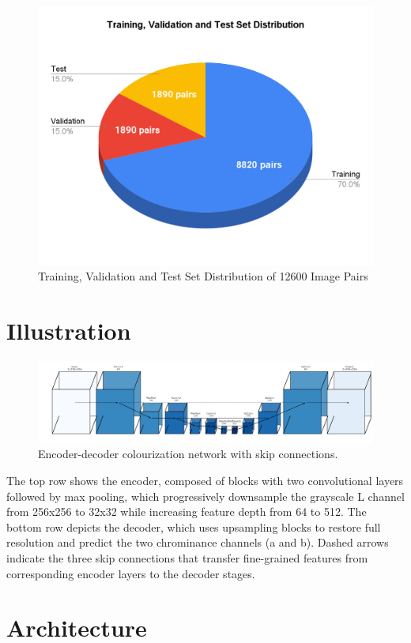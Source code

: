 \documentclass{article} %
\begin{document}
\begin{figure}[htbp]            %
  \centering
  \includegraphics[width=0.65\linewidth]{Figs/dataset1.png}
  \caption{Training, Validation and Test Set Distribution of 12600 Image Pairs}
  \label{fig:dataset}
\end{figure}

\section{Illustration}

\begin{figure}[htbp]            %
  \centering
  \includegraphics[width=0.9\linewidth]{Figs/architecture.png}
  \caption{Encoder-decoder colourization network with skip connections.}
  \label{fig:architecture}
\end{figure}

The top row shows the encoder, composed of blocks with two convolutional layers followed by max pooling, which progressively downsample the grayscale L channel from 256x256 to 32x32 
while increasing feature depth from 64 to 512. The bottom row depicts the decoder, which uses upsampling blocks to restore full resolution and predict the two chrominance channels 
(a and b). Dashed arrows indicate the three skip connections that transfer fine-grained features from corresponding encoder layers to the decoder stages.

\section{Architecture}
\end{document}
